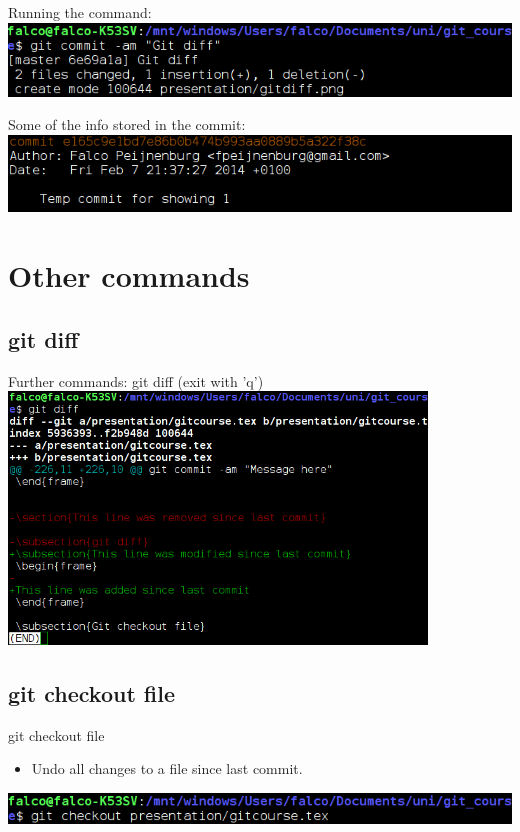 \documentclass[10pt,a4paper]{beamer}
\begin{document}
\begin{frame}
Running the command:
\includegraphics[width=\linewidth]{gitcommitdone.png}

Some of the info stored in the commit:
\includegraphics[width=\linewidth]{gitlogcommit.png}
\end{frame}

\section{Other commands}

\subsection{git diff}
\begin{frame}{Further commands: git diff (exit with 'q') }
\includegraphics[width=30em]{gitdiff.png}
\end{frame}

\subsection{git checkout file}
\begin{frame}{git checkout file}
\begin{itemize}
\item Undo all changes to a file since last commit.
\end{itemize}
\includegraphics[width=\linewidth]{gitcheckoutfile.png}
\end{frame}
\end{document}
